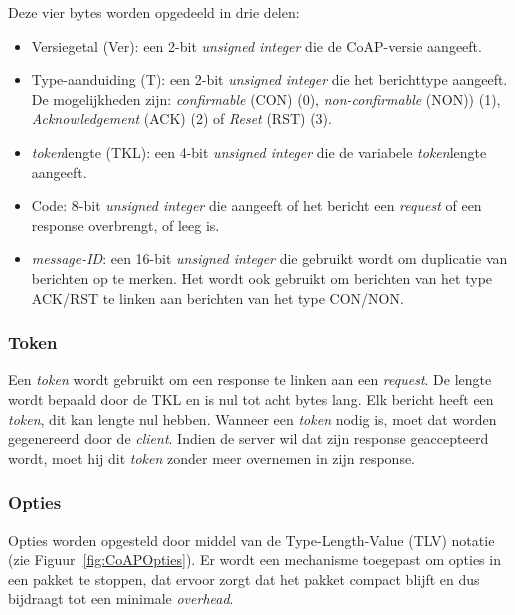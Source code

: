 Deze vier bytes worden opgedeeld in drie delen:
\begin{itemize}
\item Versiegetal (Ver): een 2-bit \textit{unsigned integer} die de CoAP-versie aangeeft. 
\item Type-aanduiding (T): een 2-bit \textit{unsigned integer} die het berichttype aangeeft. De mogelijkheden zijn: \textit{confirmable} (CON)  (0), \textit{non-confirmable} (NON))  (1), \textit{Acknowledgement} (ACK)  (2) of \textit{Reset} (RST)  (3).
\item \textit{token}lengte (TKL): een 4-bit \textit{unsigned integer} die de variabele \textit{token}lengte aangeeft.
\item Code: 8-bit \textit{unsigned integer} die aangeeft of het bericht een \textit{request} of een response overbrengt, of leeg is.
\item \textit{message-ID}: een 16-bit \textit{unsigned integer} die gebruikt wordt om duplicatie van berichten op te merken. Het wordt ook gebruikt om berichten van het type ACK/RST te linken aan berichten van het type CON/NON.
\end{itemize}

\subsubsection{Token}

Een \textit{token} wordt gebruikt om een response te linken aan een \textit{request}. De lengte wordt bepaald door de TKL en is nul tot acht bytes lang. Elk bericht heeft een \textit{token}, dit kan lengte nul hebben. Wanneer een \textit{token} nodig is, moet dat worden gegenereerd door de \textit{client}. Indien de server wil dat zijn response geaccepteerd wordt, moet hij dit \textit{token} zonder meer overnemen in zijn response.

\subsubsection{Opties}

Opties worden opgesteld door middel van de Type-Length-Value (TLV) notatie (zie Figuur~\ref{fig:CoAPOpties}). Er wordt een mechanisme toegepast om opties in een pakket te stoppen, dat ervoor zorgt dat het pakket compact blijft en dus bijdraagt tot een minimale \textit{overhead}.\\

